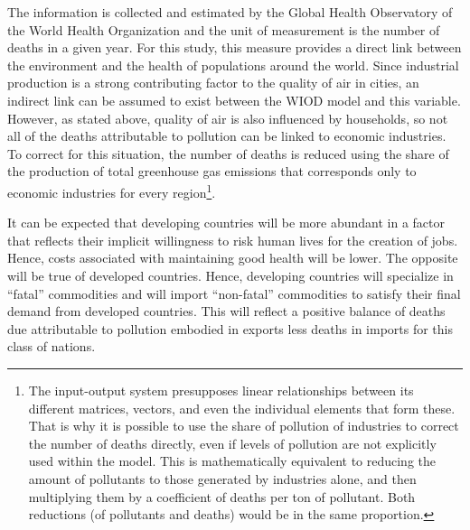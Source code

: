 \documentclass[a4paper,12pt]{article}
\begin{document}
The information is collected and estimated by the Global Health Observatory of the World Health Organization and the unit of measurement is the number of deaths in a given year. For this study, this measure provides a direct link between the environment and the health of populations around the world. Since industrial production is a strong contributing factor to the quality of air in cities, an indirect link can be assumed to exist between the WIOD model and this variable. However, as stated above, quality of air is also influenced by households, so not all of the deaths attributable to pollution can be linked to economic industries. To correct for this situation, the number of deaths is reduced using the share of the production of total greenhouse gas emissions that corresponds only to economic industries for every region\footnote{The input-output system presupposes linear relationships between its different matrices, vectors, and even the individual elements that form these. That is why it is possible to use the share of pollution of industries to correct the number of deaths directly, even if levels of pollution are not explicitly used within the model. This is mathematically equivalent to reducing the amount of pollutants to those generated by industries alone, and then multiplying them by a coefficient of deaths per ton of pollutant. Both reductions (of pollutants and deaths) would be in the same proportion.}.

It can be expected that developing countries will be more abundant in a factor that reflects their implicit willingness to risk human lives for the creation of jobs. Hence, costs associated with maintaining good health will be lower. The opposite will be true of developed countries. Hence, developing countries will specialize in ``fatal'' commodities and will import ``non-fatal'' commodities to satisfy their final demand from developed countries. This will reflect a positive balance of deaths due attributable to pollution embodied in exports less deaths in imports for this class of nations.
\end{document}
